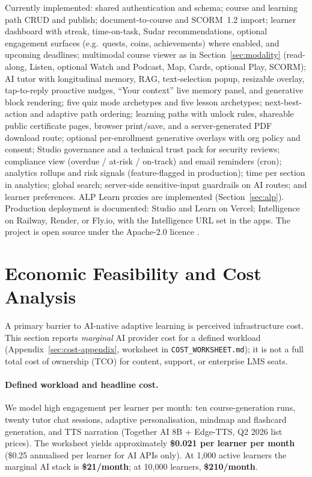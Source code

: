 \documentclass[10pt,twocolumn]{article}
\begin{document}
Currently implemented: shared authentication and schema; course and
learning path CRUD and publish; document-to-course and SCORM~1.2
import; learner dashboard with streak, time-on-task, Sudar
recommendations, optional engagement surfaces (e.g.\ quests, coins,
achievements) where enabled, and upcoming deadlines; multimodal
course viewer as in Section~\ref{sec:modality} (read-along, Listen,
optional Watch and Podcast, Map, Cards, optional Play, SCORM); AI
tutor with longitudinal memory, RAG, text-selection popup, resizable
overlay, tap-to-reply proactive nudges, ``Your context'' live memory
panel, and generative block rendering; five quiz mode archetypes and
five lesson archetypes; next-best-action and adaptive path ordering;
learning paths with unlock rules, shareable public certificate pages,
browser print/save, and a server-generated PDF download route; optional
per-enrollment generative overlays with org policy and consent; Studio
governance and a technical trust pack for security reviews; compliance
view (overdue / at-risk / on-track) and email reminders
(cron); analytics rollups and risk signals (feature-flagged in
production); time per section in analytics; global search; server-side
sensitive-input guardrails on AI routes; and learner preferences. ALP
Learn proxies are implemented (Section~\ref{sec:alp}). Production
deployment is documented: Studio and Learn on Vercel; Intelligence on
Railway, Render, or Fly.io, with the Intelligence URL set in the apps.
The project is open source under the Apache-2.0 licence \cite{sudar2026}.

\section{Economic Feasibility and Cost Analysis}
\label{sec:economics}

A primary barrier to AI-native adaptive learning is perceived
infrastructure cost. This section reports \emph{marginal} AI provider
cost for a defined workload (Appendix~\ref{sec:cost-appendix}, worksheet
in \texttt{COST\_WORKSHEET.md}); it is not a full total cost of ownership
(TCO) for content, support, or enterprise LMS seats.

\paragraph{Defined workload and headline cost.}
We model high engagement per learner per month: ten course-generation
runs, twenty tutor chat sessions, adaptive personalisation, mindmap and
flashcard generation, and TTS narration (Together AI 8B + Edge-TTS,
Q2 2026 list prices). The worksheet yields approximately
\textbf{\$0.021 per learner per month} (\$0.25 annualised per learner for
AI APIs only). At 1{,}000 active learners the marginal AI stack is
\textbf{\$21/month}; at 10{,}000 learners, \textbf{\$210/month}.
\end{document}
